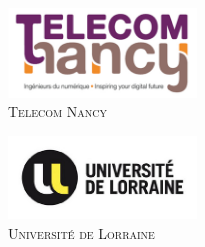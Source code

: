 \newenvironment{changemargin}[2]{\begin{list}{}{%
\setlength{\topsep}{0pt}%
\setlength{\leftmargin}{0pt}%
\setlength{\rightmargin}{0pt}%
\setlength{\listparindent}{\parindent}%
\setlength{\itemindent}{\parindent}%
\setlength{\parsep}{0pt plus 1pt}%
\addtolength{\leftmargin}{#1}%
\addtolength{\rightmargin}{#2}%
}\item }{\end{list}}

\begin{titlepage}

\begin{flushleft}


\end{flushleft}

\begin{center}

\begin{minipage}[t]{0.48\textwidth}
  \begin{flushleft}
	\includegraphics [width=50mm]{images/logo-telecom.png} \\[0.5cm]
      \textsc{\LARGE Telecom Nancy}
  \end{flushleft}
\end{minipage}
\begin{minipage}[t]{0.48\textwidth}
  \begin{flushright}
    \includegraphics [width=50mm]{images/logo-ul.jpg} \\[0.5cm]
    \textsc{\LARGE Université de Lorraine}
  \end{flushright}
\end{minipage} \\[1.5cm]


	\textsc{\Large \reportsubject}\\[0.5cm]
	\HRule \\[0.4cm]
	{\huge \bfseries \reporttitle}\\[0.4cm]
	\HRule \\[1.5cm]
	

\end{center}
\end{titlepage}

